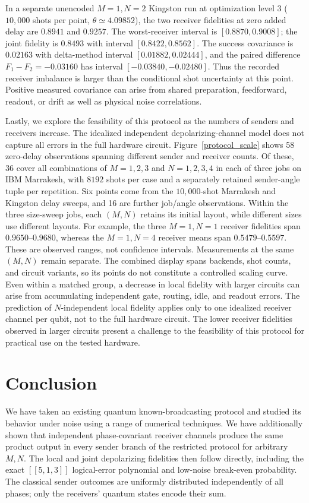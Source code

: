 \documentclass[aps,physrev,10pt,twocolumn,superscriptaddress,floatfix]{revtex4-2}
\begin{document}
In a separate unencoded $M=1,N=2$ Kingston run at optimization level 3 ($10{,}000$ shots per point, $\theta\simeq4.09852$), the two receiver fidelities at zero added delay are $0.8941$ and $0.9257$. The worst-receiver interval is $[0.8870,0.9008]$; the joint fidelity is $0.8493$ with interval $[0.8422,0.8562]$. The success covariance is $0.02163$ with delta-method interval $[0.01882,0.02444]$, and the paired difference $F_1-F_2=-0.03160$ has interval $[-0.03840,-0.02480]$. Thus the recorded receiver imbalance is larger than the conditional shot uncertainty at this point. Positive measured covariance can arise from shared preparation, feedforward, readout, or drift as well as physical noise correlations.

Lastly, we explore the feasibility of this protocol as the numbers of senders and receivers increase. The idealized independent depolarizing-channel model does not capture all errors in the full hardware circuit. Figure~\ref{protocol_scale} shows 58 zero-delay observations spanning different sender and receiver counts. Of these, 36 cover all combinations of $M=1,2,3$ and $N=1,2,3,4$ in each of three jobs on IBM Marrakesh, with $8192$ shots per case and a separately retained sender-angle tuple per repetition. Six points come from the $10{,}000$-shot Marrakesh and Kingston delay sweeps, and 16 are further job/angle observations. Within the three size-sweep jobs, each $(M,N)$ retains its initial layout, while different sizes use different layouts. For example, the three $M=1,N=1$ receiver fidelities span $0.9650$--$0.9680$, whereas the $M=1,N=4$ receiver means span $0.5479$--$0.5597$. These are observed ranges, not confidence intervals. Measurements at the same $(M,N)$ remain separate. The combined display spans backends, shot counts, and circuit variants, so its points do not constitute a controlled scaling curve. Even within a matched group, a decrease in local fidelity with larger circuits can arise from accumulating independent gate, routing, idle, and readout errors. The prediction of $N$-independent local fidelity applies only to one idealized receiver channel per qubit, not to the full hardware circuit. The lower receiver fidelities observed in larger circuits present a challenge to the feasibility of this protocol for practical use on the tested hardware.

\section{Conclusion}
We have taken an existing quantum known-broadcasting protocol and studied its behavior under noise using a range of numerical techniques. We have additionally shown that independent phase-covariant receiver channels produce the same product output in every sender branch of the restricted protocol for arbitrary $M,N$. The local and joint depolarizing fidelities then follow directly, including the exact $[[5,1,3]]$ logical-error polynomial and low-noise break-even probability. The classical sender outcomes are uniformly distributed independently of all phases; only the receivers' quantum states encode their sum.
\end{document}
